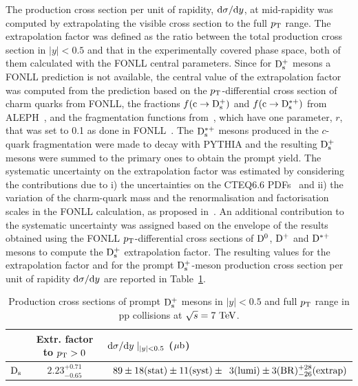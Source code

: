 The production cross section per unit of rapidity, ${\rm d}\sigma/{\rm d}y$, 
at mid-rapidity was computed by extrapolating the 
visible cross section to the full $p_{\rm T}$ range.
The extrapolation factor was defined as
the ratio between the total production cross section in $|y|<0.5$ and that 
in the experimentally covered phase space, both of them calculated with the
FONLL central parameters. 
Since for ${\rm D_s^+}$ mesons a FONLL prediction is not available,
the central value of the extrapolation factor was computed 
from the prediction based on the $p_{\rm T}$-differential cross section of charm 
quarks from FONLL, the fractions $f({\rm c\rightarrow {\rm D_s^+}})$ and 
$f({\rm c\rightarrow D_{\rm s}^{*+}})$ from ALEPH~\cite{Barate:1999bg}, and the 
fragmentation functions from~\cite{Braaten:1994bz}, which have one parameter, 
$r$, that was set to 0.1 as done in FONLL~\cite{Cacciari:2003zu}.
The ${\rm D}_{\rm s}^{*+}$ mesons produced in the $c$-quark fragmentation were 
made to decay with PYTHIA and the resulting ${\rm D_s^+}$ mesons were summed to the 
primary ones to obtain the prompt yield.
The systematic uncertainty on the extrapolation factor was estimated by
considering the contributions due to i) the uncertainties on the 
CTEQ6.6 PDFs~\cite{Pumplin:2002vw} and ii) the variation of the charm-quark 
mass and the renormalisation and factorisation scales in the FONLL 
calculation, as proposed in~\cite{Cacciari:2012ny}.
An additional contribution to the systematic uncertainty  was assigned
based on the envelope of the results obtained using the 
FONLL $p_{\rm T}$-differential cross sections of ${\rm D^0}$, 
${\rm D^+}$ and ${\rm D^{*+}}$ mesons to compute the ${\rm D_s^+}$ extrapolation factor.
The resulting values for the extrapolation factor and for the prompt ${\rm D_s^+}$-meson 
production cross section per unit of rapidity ${\rm d}\sigma/{\rm d}y$ are 
reported in Table~\ref{tab:dsdy}.
\begin{table}[!h]
\centering
\begin{tabular}{c|c|l} 
 & Extr. factor to $p_{\rm T}>0$ & ${\rm d}\sigma/{\rm d}y \mid_{|y|<0.5}$ ($\mathrm{\mu b}$) \\
\hline
\rule{0pt}{12pt} 
${\rm D_s}$     & $2.23^{+0.71}_{-0.65}$ &  $\phantom{0}89 \pm 18 ({\rm stat}) \pm 11 ({\rm syst}) \pm \phantom{0}3 ({\rm lumi}) \pm 3 ({\rm BR})^{+28}_{-26} ({\rm extrap})$\\[1ex]
\hline
\end{tabular}
\caption{Production cross sections of prompt ${\rm D_s^+}$ mesons in \mbox{$|y| < 0.5$} and full $p_{\rm T}$ range in pp collisions at $\sqrt{s} = 7~\mathrm{TeV}$.}
\label{tab:dsdy}
\end{table}
